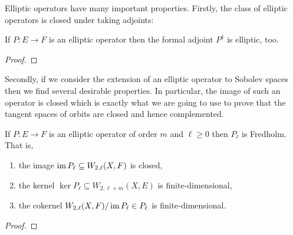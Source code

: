 \documentclass[12pt]{ociamthesis}  %
\begin{document}
Elliptic operators have many important properties. Firstly, the class
of elliptic operators is closed under taking adjoints:

\begin{lemma}\label{lem:elliptic_adjoints}
  If $P : E \to F$ is an elliptic operator then the formal adjoint
  $P^\dagger$ is elliptic, too.
  \begin{proof}
    \missingproof
  \end{proof}
\end{lemma}

Secondly, if we consider the extension of an elliptic operator
to Sobolev spaces then we find several desirable properties.
In particular, the image of such an operator is closed which is
exactly what we are going to use to prove that the tangent spaces
of orbits are closed and hence complemented.

\begin{theorem}\label{thm:fredholm_extension}
  If $P : E\to F$ is an elliptic operator of order $m$ and $\ell\geq 0$
  then $P_\ell$ is Fredholm. That is,
  \begin{enumerate}
    \item the image $\operatorname{im} P_\ell \subseteq W_{2,\ell}(X,F)$ is closed,
    \item the kernel $\ker P_\ell \subseteq W_{2,\ell+m}(X,E)$ is finite-dimensional,
    \item the cokernel $W_{2,\ell}(X,F)/\operatorname{im} P_\ell\in P_\ell$ is finite-dimensional.
  \end{enumerate}
  \begin{proof}
    \missingproof
  \end{proof}
\end{theorem}
\end{document}
